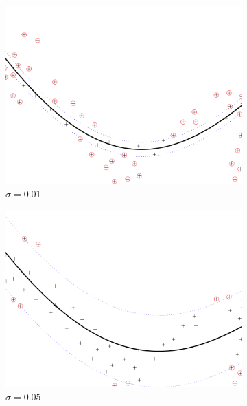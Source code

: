 \documentclass[a4paper, 11pt, one column]{article}
\begin{document}
\begin{figure}[]
        \begin{subfigure}{0.33\linewidth}
            \includegraphics[width=\linewidth]{images/rbf_bound_100_e_0.01.png}
            \caption{$\sigma = 0.01$}
        \end{subfigure}\hfil
        \begin{subfigure}{0.33\linewidth}
            \includegraphics[width=\linewidth]{images/rbf_bound_100_e_0.05.png}
            \caption{$\sigma = 0.05$}
        \end{subfigure}\hfil
        \centering
        \begin{subfigure}{0.33\linewidth}

\end{subfigure}
\end{figure}
\end{document}
